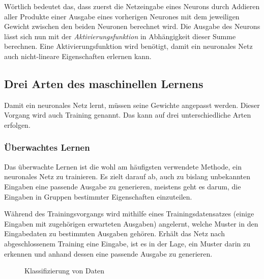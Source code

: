 \documentclass[12pt,a4]{article}
\begin{document}
Wörtlich bedeutet das, dass zuerst die Netzeingabe eines Neurons durch Addieren aller Produkte einer Ausgabe eines vorherigen Neurones mit dem jeweiligen Gewicht zwischen den beiden Neuronen berechnet wird. Die Ausgabe des Neurons lässt sich nun mit der \textit{Aktivierungsfunktion} in Abhängigkeit dieser Summe berechnen. Eine Aktivierungsfunktion wird benötigt, damit ein neuronales Netz auch nicht-lineare Eigenschaften erlernen kann.

\subsection{Drei Arten des maschinellen Lernens \cite{PythonMachineLearningChapter1}}\label{sec:MachineLearningTypes}
Damit ein neuronales Netz lernt, müssen seine Gewichte angepasst werden. Dieser Vorgang wird auch Training genannt. Das kann auf drei unterschiedliche Arten erfolgen.

\subsubsection{Überwachtes Lernen}\label{sec:SupervisedLearning}
Das überwachte Lernen ist die wohl am häufigsten verwendete Methode, ein neuronales Netz zu trainieren. Es zielt darauf ab, auch zu bislang unbekannten Eingaben eine passende Ausgabe zu generieren, meistens geht es darum, die Eingaben in Gruppen bestimmter Eigenschaften einzuteilen. 

Während des Trainingsvorgangs wird mithilfe eines Trainingsdatensatzes (einige Eingaben mit zugehörigen erwarteten Ausgaben) angelernt, welche Muster in den Eingabedaten zu bestimmten Ausgaben gehören. Erhält das Netz nach abgeschlossenem Training eine Eingabe, ist es in der Lage, ein Muster darin zu erkennen und anhand dessen eine passende Ausgabe zu generieren.

\begin{figure}[!h]
\centering
{}
\caption{Klassifizierung von Daten}
\label{fig:SupervisedLearning}
\end{figure}
\end{document}

